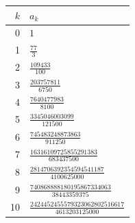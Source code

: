 \begin{tabular}{r@{\qquad}l}
\toprule
$k$ & $a_k$ \\
\midrule
0 & $1$ \\[1.2ex]
1 & $\frac{77}{3}$ \\[1.2ex]
2 & $\frac{109433}{100}$ \\[1.2ex]
3 & $\frac{203757811}{6750}$ \\[1.2ex]
4 & $\frac{7640477983}{8100}$ \\[1.2ex]
5 & $\frac{3345046003099}{121500}$ \\[1.2ex]
6 & $\frac{745483248873863}{911250}$ \\[1.2ex]
7 & $\frac{16316109725855291383}{683437500}$ \\[1.2ex]
8 & $\frac{2814706392354594541187}{4100625000}$ \\[1.2ex]
9 & $\frac{740868888180195867334063}{38443359375}$ \\[1.2ex]
10 & $\frac{2424452455579323062802516617}{4613203125000}$ \\[1.2ex]
\bottomrule
\end{tabular}
